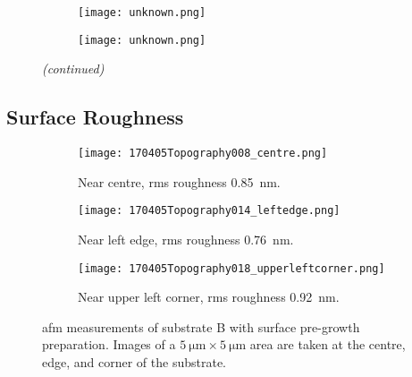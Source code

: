 \begin{figure}[htbp]
\ContinuedFloat
    \centering
    \begin{subfigure}[t]{\textwidth}
          \begin{minipage}[t]{0.49\linewidth}
            \centering
            \texttt{[image: unknown.png]}
          \end{minipage}
          \hfill
          \begin{minipage}[t]{0.49\linewidth}
            \centering
            \texttt{[image: unknown.png]}
          \end{minipage}
        \caption{}\label{fig:add_label}
    \end{subfigure}
    \captionsetup{list=no}
    \caption{\emph{(continued)}}
\end{figure}



\subsection{Surface Roughness}
\begin{figure}[htbp]
    \centering
    \begin{subfigure}[t]{\linewidth}
    \centering
        \texttt{[image: 170405Topography008\_centre.png]}
        \caption{Near centre, \ac{rms} roughness \SI{0.85}{\nano\metre}.}%
    \end{subfigure}%
    \par\bigskip
    \begin{subfigure}[t]{\linewidth}
    \centering
        \texttt{[image: 170405Topography014\_leftedge.png]}
        \caption{Near left edge, \ac{rms} roughness \SI{0.76}{\nano\metre}.}%
    \end{subfigure}%
    \par\bigskip
    \begin{subfigure}[t]{\linewidth}
    \centering
        \texttt{[image: 170405Topography018\_upperleftcorner.png]}
        \caption{Near upper left corner, \ac{rms} roughness \SI{0.92}{\nano\metre}.} %
    \end{subfigure}%
    \caption[\Ac{afm} of substrate B with surface pre-growth preparation.]{\Acf{afm} measurements of substrate B with surface pre-growth preparation. Images of a $\SI{5}{\micro\metre}\times\SI{5}{\micro\metre}$ area are taken at the centre, edge, and corner of the substrate.}\label{fig:afm_subBb}
\end{figure} %

